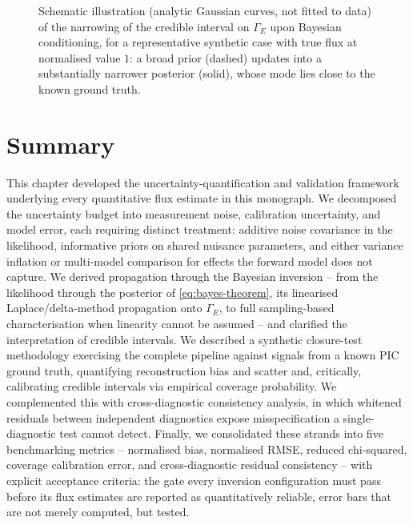 \begin{figure}[htbp]
\centering
{}
\caption{Schematic illustration (analytic Gaussian curves, not fitted to data) of the narrowing of the credible interval on $\Gamma_{E}$ upon Bayesian conditioning, for a representative synthetic case with true flux at normalised value $1$: a broad prior (dashed) updates into a substantially narrower posterior (solid), whose mode lies close to the known ground truth.}
\label{fig:posterior-narrowing}
\end{figure}

\section{Summary}
\label{sec:uq-summary}

This chapter developed the uncertainty-quantification and validation framework underlying every quantitative flux estimate in this monograph. We decomposed the uncertainty budget into measurement noise, calibration uncertainty, and model error, each requiring distinct treatment: additive noise covariance in the likelihood, informative priors on shared nuisance parameters, and either variance inflation or multi-model comparison for effects the forward model does not capture. We derived propagation through the Bayesian inversion -- from the likelihood through the posterior of \cref{eq:bayes-theorem}, its linearised Laplace/delta-method propagation onto $\Gamma_{E}$, to full sampling-based characterisation when linearity cannot be assumed -- and clarified the interpretation of credible intervals. We described a synthetic closure-test methodology exercising the complete pipeline against signals from a known PIC ground truth, quantifying reconstruction bias and scatter and, critically, calibrating credible intervals via empirical coverage probability. We complemented this with cross-diagnostic consistency analysis, in which whitened residuals between independent diagnostics expose misspecification a single-diagnostic test cannot detect. Finally, we consolidated these strands into five benchmarking metrics -- normalised bias, normalised RMSE, reduced chi-squared, coverage calibration error, and cross-diagnostic residual consistency -- with explicit acceptance criteria: the gate every inversion configuration must pass before its flux estimates are reported as quantitatively reliable, error bars that are not merely computed, but tested.
